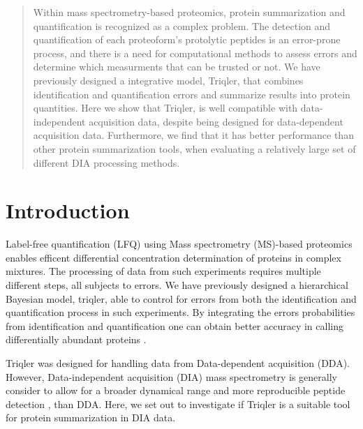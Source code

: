 \documentclass[10pt,letterpaper]{article}
\begin{document}
\maketitle




\begin{abstract}

Within mass spectrometry-based proteomics, protein summarization and quantification is recognized as a complex problem. The detection and quantification of each proteoform's protolytic peptides is an error-prone process, and there is a need for computational methods to assess errors and determine which measurments that can be trusted or not.  We have previously designed a integrative model, Triqler, that combines identification and quantification errors and summarize results into protein quantities. 
Here we show that Triqler, is well compatible with data-independent acquisition data, despite being designed for data-dependent acquisition data. Furthermore, we find that it has better performance than other protein summarization tools, when evaluating a relatively large set of different DIA processing methods. 

\end{abstract}
  

\section*{Introduction}
Label-free quantification (LFQ) using Mass spectrometry (MS)-based proteomics enables efficent differential concentration determination of proteins in complex mixtures. The processing of data from such experiments requires multiple different steps, all subjects to errors. We have previously designed a hierarchical Bayesian model, triqler, able to control for errors from both the identification and quantification process in such experiments\cite{The2018Integrated}. By integrating the errors probabilities from identification and quantification one can obtain better accuracy in calling differentially abundant proteins \cite{kall2020integrating}.   

Triqler was designed for handling data from Data-dependent acquisition (DDA). However, Data-independent acquisition (DIA) mass spectrometry is generally consider to allow for a broader dynamical range and more reproducible peptide detection \cite{zhang2020DIA, Lu2021DIAmeter}, than DDA. Here, we set out to investigate if Triqler is a suitable tool for protein summarization in DIA data.
\end{document}
